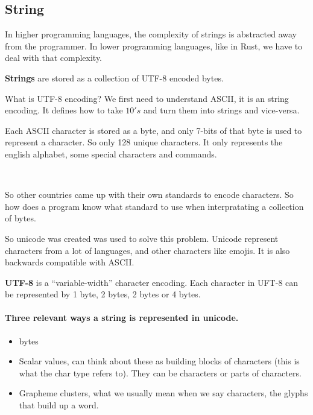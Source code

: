 \subsection{String}

In higher programming languages, the complexity of strings is abstracted away from the programmer. In lower programming languages, like in Rust, we have to deal with 
that complexity.

\begin{definition}
    \textbf{Strings} are stored as a collection of UTF-8 encoded bytes. 
\end{definition}

What is UTF-8 encoding? We first need to understand ASCII, it is an string encoding. It defines how to take $10's$ and turn them into strings and vice-versa.

Each ASCII character is stored as a byte, and only 7-bits of that byte is used to represent a character. So only 128 unique characters.
It only represents the english alphabet, some special characters and commands.

\

So other countries came up with their own standards to encode characters. So how does a program know what standard to use when interpratating a collection of bytes.

So unicode was created was used to solve this problem. Unicode represent characters from a lot of languages, and other characters like emojis. It is also backwards compatible with ASCII.

\begin{definition}
    \textbf{UTF-8} is a ``variable-width'' character encoding. Each character in UFT-8 can be represented by 1 byte, 2 bytes, 2 bytes or 4 bytes. 
\end{definition}

\paragraph*{Three relevant ways a string is represented in unicode.}


\begin{itemize}
    \item bytes
    \item Scalar values, can think about these as building blocks of characters (this is what the char type refers to). They can be characters or parts of characters.
    \item Grapheme clusters, what we usually mean when we say characters, the glyphs that build up a word. 
\end{itemize}

